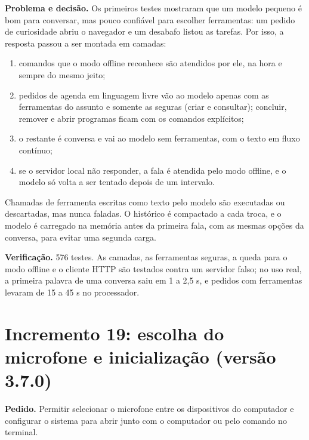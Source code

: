 \textbf{Problema e decisão.} Os primeiros testes mostraram que um modelo pequeno é bom para conversar,
mas pouco confiável para escolher ferramentas: um pedido de curiosidade abriu o navegador e um
desabafo listou as tarefas. Por isso, a resposta passou a ser montada em camadas:
\begin{enumerate}[label=\alph*)]
  \item comandos que o modo offline reconhece são atendidos por ele, na hora e sempre do mesmo jeito;
  \item pedidos de agenda em linguagem livre vão ao modelo apenas com as ferramentas do assunto e
        somente as seguras (criar e consultar); concluir, remover e abrir programas ficam com os
        comandos explícitos;
  \item o restante é conversa e vai ao modelo sem ferramentas, com o texto em fluxo contínuo;
  \item se o servidor local não responder, a fala é atendida pelo modo offline, e o modelo só volta a
        ser tentado depois de um intervalo.
\end{enumerate}

Chamadas de ferramenta escritas como texto pelo modelo são executadas ou descartadas, mas nunca
faladas. O histórico é compactado a cada troca, e o modelo é carregado na memória antes da primeira
fala, com as mesmas opções da conversa, para evitar uma segunda carga.

\textbf{Verificação.} 576 testes. As camadas, as ferramentas seguras, a queda para o modo offline e o
cliente HTTP são testados contra um servidor falso; no uso real, a primeira palavra de uma conversa
saiu em 1 a 2,5 s, e pedidos com ferramentas levaram de 15 a 45 s no processador.

\section{Incremento 19: escolha do microfone e inicialização (versão 3.7.0)}

\textbf{Pedido.} Permitir selecionar o microfone entre os dispositivos do computador e configurar o
sistema para abrir junto com o computador ou pelo comando  no terminal.

